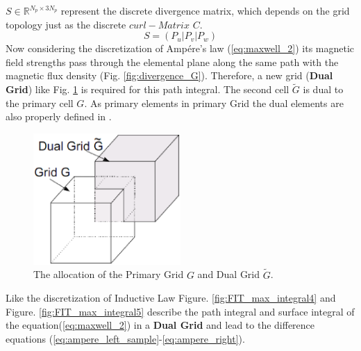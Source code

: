 $S\in \mathbb{R}^{N_{p}\times 3N_{p}}$ represent the discrete divergence matrix, which depends on the grid topology just as the discrete $curl-Matrix$ $C$.
\begin{equation}
S=(P_{u}|P_{v}|P_{w})
\label{eq:S_matrix}
\end{equation}
Now considering the discretization of Amp\'ere's law (\ref{eq:maxwell_2}) its magnetic field strengths pass through the elemental plane along the same path with the magnetic flux density (Fig. \ref{fig:divergence_G}). Therefore, a new grid (\textbf{Dual Grid}) like Fig. \ref{fig:dual_grid} is required for this path integral. The second cell $\tilde{G}$ is dual to the primary cell $G$. As primary elements in primary Grid the dual elements are also properly defined in \cite{script_FeldSim}.
\begin{figure}[!ht]
\centering
\includegraphics[width=0.5\textwidth]{bilder/dual_grid}
\caption{The allocation of the Primary Grid $G$ and Dual Grid $\tilde{G}$\cite{FIT_discrete_electrommagnetism}.}
\label{fig:dual_grid}
\end{figure}
Like the discretization of Inductive Law Figure. \ref{fig:FIT_max_integral4} and Figure.  \ref{fig:FIT_max_integral5} describe the path integral and surface integral of the equation(\ref{eq:maxwell_2}) in a \textbf{Dual Grid} and lead to the difference equations (\ref{eq:ampere_left_sample}-\ref{eq:ampere_right}).
